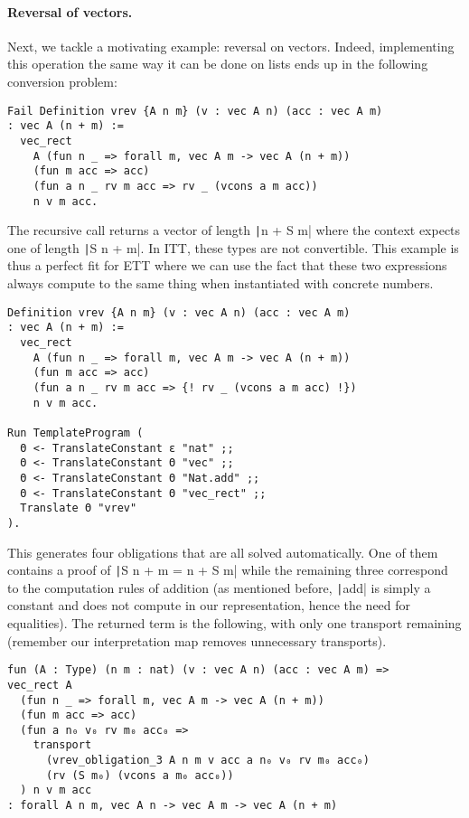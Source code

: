 \paragraph{Reversal of vectors.}
%
Next, we tackle a motivating example: reversal on vectors.
Indeed, implementing this operation the same way it can
be done on lists ends up in the following conversion problem:
%
\begin{verbatim}
Fail Definition vrev {A n m} (v : vec A n) (acc : vec A m)
: vec A (n + m) :=
  vec_rect
    A (fun n _ => forall m, vec A m -> vec A (n + m))
    (fun m acc => acc)
    (fun a n _ rv m acc => rv _ (vcons a m acc))
    n v m acc.
\end{verbatim}
%
The recursive call returns a vector of length \texttt|n + S m|
where the context expects one of length \texttt|S n + m|. In
\acrshort{ITT}, these types are not convertible. This example is thus a perfect
fit for \acrshort{ETT} where we can use the fact that these two expressions
always compute to the same thing when instantiated with concrete numbers.
%
\begin{verbatim}
Definition vrev {A n m} (v : vec A n) (acc : vec A m)
: vec A (n + m) :=
  vec_rect
    A (fun n _ => forall m, vec A m -> vec A (n + m))
    (fun m acc => acc)
    (fun a n _ rv m acc => {! rv _ (vcons a m acc) !})
    n v m acc.

Run TemplateProgram (
  Θ <- TranslateConstant ε "nat" ;;
  Θ <- TranslateConstant Θ "vec" ;;
  Θ <- TranslateConstant Θ "Nat.add" ;;
  Θ <- TranslateConstant Θ "vec_rect" ;;
  Translate Θ "vrev"
).
\end{verbatim}
%
This generates four obligations that are all solved automatically. One of
them contains a proof of \texttt|S n + m = n + S m| while the remaining
three correspond to the computation rules of addition (as mentioned before,
\texttt|add| is simply a constant and does not compute in our
representation, hence the need for equalities).
%
The returned term is the following, with only one transport remaining
(remember our interpretation map removes unnecessary transports).
\begin{verbatim}
fun (A : Type) (n m : nat) (v : vec A n) (acc : vec A m) =>
vec_rect A
  (fun n _ => forall m, vec A m -> vec A (n + m))
  (fun m acc => acc)
  (fun a n₀ v₀ rv m₀ acc₀ =>
    transport
      (vrev_obligation_3 A n m v acc a n₀ v₀ rv m₀ acc₀)
      (rv (S m₀) (vcons a m₀ acc₀))
  ) n v m acc
: forall A n m, vec A n -> vec A m -> vec A (n + m)
\end{verbatim}

